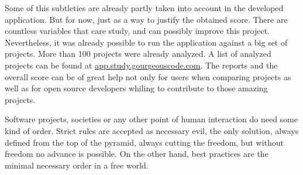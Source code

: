 Some of this subtleties are already partly taken into account in the developed application.
But for now, just as a way to justify the obtained score. 
There are countless variables that care study, and can possibly improve this project.
Nevertheless, it was already possible to run the application against a big set of projects.
More than 100 projects were already analyzed.
A list of analyzed projects can be found at \url{app.study.gourgeouscode.com}.
The reports and the overall score can be of great help not only for users when comparing projects as well as
for open source developers whiling to contribute to those amazing projects.

Software projects, societies or any other point of human interaction do need some kind of order.
Strict rules are accepted as necessary evil, the only solution, always defined from the top of the pyramid,
always cutting the freedom, but without freedom no advance is possible.
On the other hand, best practices are the minimal necessary order in a free world.
